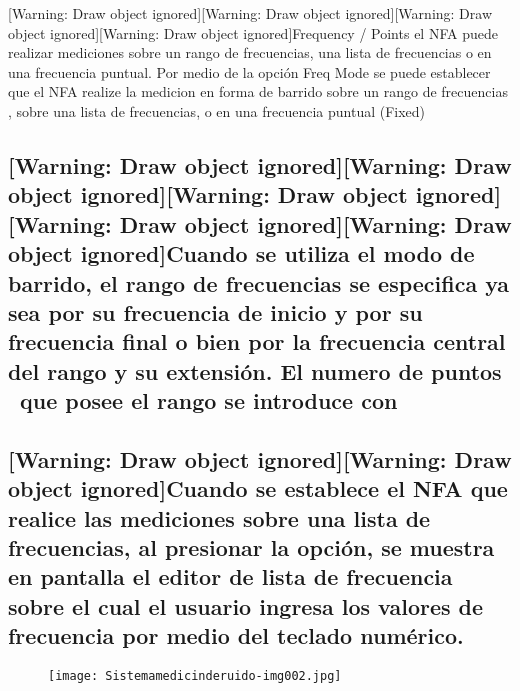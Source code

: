 \documentclass[paper=letter,oneside,fontsize=10pt,parskip=full]{article}
\begin{document}
\bigskip


\bigskip


\bigskip

[Warning: Draw object ignored][Warning: Draw object ignored][Warning: Draw object ignored][Warning: Draw object
ignored]Frequency / Points el NFA puede realizar mediciones sobre un rango de frecuencias, una lista de frecuencias o
en una frecuencia puntual. Por medio de la opción Freq Mode se puede establecer que el NFA realize la medicion en forma
de barrido sobre un rango de frecuencias , sobre una lista de frecuencias, o en una frecuencia puntual (Fixed) 

\subsection[Cuando se utiliza el modo de barrido, el rango de frecuencias se especifica ya sea por su frecuencia de
inicio y por su frecuencia final o bien por la frecuencia central del rango y su extensión. El numero de puntos \ que
posee el rango se introduce con ]{[Warning: Draw object ignored][Warning: Draw object ignored][Warning: Draw object
ignored][Warning: Draw object ignored][Warning: Draw object ignored]Cuando se utiliza el modo de barrido, el rango de
frecuencias se especifica ya sea por su frecuencia de inicio y por su frecuencia final o bien por la frecuencia central
del rango y su extensión. El numero de puntos \ que posee el rango se introduce con }
\subsection[Cuando se establece el NFA que realice las mediciones sobre una lista de frecuencias, al presionar la
opción, se muestra en pantalla el editor de lista de frecuencia sobre el cual el usuario ingresa los valores de
frecuencia por medio del teclado numérico.]{[Warning: Draw object ignored][Warning: Draw object ignored]Cuando se
establece el NFA que realice las mediciones sobre una lista de frecuencias, al presionar la opción, se muestra en
pantalla el editor de lista de frecuencia sobre el cual el usuario ingresa los valores de frecuencia por medio del
teclado numérico.}
\begin{figure}
\centering
\texttt{[image: Sistemamedicinderuido-img002.jpg]}
\end{figure}
\end{document}
